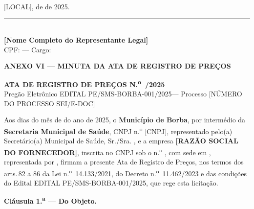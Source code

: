 \documentclass[12pt,a4paper]{article}
\newcommand{\clausula}[1]{\vspace{6pt}\noindent\textbf{Cláusula #1.}}
\newcommand{\editalNum}{EDITAL PE/SMS-BORBA-001/2025}
\newcommand{\procNum}{[NÚMERO DO PROCESSO SEI/E-DOC]}
\newcommand{\exercicio}{2025}
\begin{document}
\vspace{1.5cm}
\begin{center}
[LOCAL], \underline{\hspace{1cm}} de \underline{\hspace{2.5cm}} de \exercicio.

\vspace{1.2cm}
\rule{8cm}{0.5pt}\\[3pt]
\textbf{[Nome Completo do Representante Legal]}\\
\small CPF: \underline{\hspace{3cm}} --- Cargo: \underline{\hspace{3cm}}
\end{center}

\clearpage
\begin{center}
  \textbf{\large\color{navy}ANEXO VI --- MINUTA DA ATA DE REGISTRO DE PREÇOS}
\end{center}

\vspace{0.3cm}
\begin{center}
  \textbf{ATA DE REGISTRO DE PREÇOS N.\textsuperscript{o}\
  \underline{\hspace{1cm}}/\exercicio}\\[4pt]
  Pregão Eletrônico \editalNum --- Processo \procNum
\end{center}

\bigskip
\noindent Aos \underline{\hspace{0.8cm}} dias do mês de
\underline{\hspace{2.5cm}} do ano de \exercicio, o \textbf{Município de Borba},
por intermédio da \textbf{Secretaria Municipal de Saúde}, CNPJ
n.\textsuperscript{o} [CNPJ], representado pelo(a)
Secretário(a) Municipal de Saúde, Sr./Sra. \underline{\hspace{4cm}}, e a empresa
\textbf{[RAZÃO SOCIAL DO FORNECEDOR]}, inscrita no CNPJ sob o
n.\textsuperscript{o} \underline{\hspace{3cm}}, com sede em
\underline{\hspace{5cm}}, representada por \underline{\hspace{4cm}},
firmam a presente Ata de Registro de Preços, nos termos dos arts.\,82 a 86 da
Lei n.\textsuperscript{o}~14.133/2021, do Decreto n.\textsuperscript{o}~11.462/2023
e das condições do Edital \editalNum, que rege esta licitação.

\bigskip
\clausula{1.\textsuperscript{a} --- Do Objeto}
\end{document}
